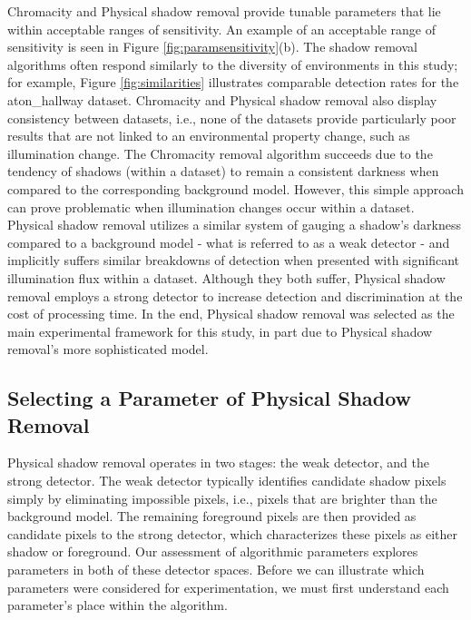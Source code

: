 Chromacity and Physical shadow removal provide tunable parameters that lie within acceptable ranges of sensitivity. An example of an acceptable range of sensitivity is seen in Figure \ref{fig:paramsensitivity}(b). The shadow removal algorithms often respond similarly to the diversity of environments in this study; for example, Figure \ref{fig:similarities} illustrates comparable detection rates for the aton\_hallway dataset. Chromacity and Physical shadow removal also display consistency between datasets, i.e., none of the datasets provide particularly poor results that are not linked to an environmental property change, such as illumination change. The Chromacity removal algorithm succeeds due to the tendency of shadows (within a dataset) to remain a consistent darkness when compared to the corresponding background model. However, this simple approach can prove problematic when illumination changes occur within a dataset. Physical shadow removal utilizes a similar system of gauging a shadow's darkness compared to a background model - what is referred to as a weak detector \cite{cucchiara2003detecting, sanin2010improved, huang2009moving} - and implicitly suffers similar breakdowns of detection when presented with significant illumination flux within a dataset. Although they both suffer, Physical shadow removal employs a strong detector to increase detection and discrimination at the cost of processing time. In the end, Physical shadow removal was selected as the main experimental framework for this study, in part due to Physical shadow removal's more sophisticated model.

\FloatBarrier
\subsection{Selecting a Parameter of Physical Shadow Removal} \label{section:selectparameter}

Physical shadow removal operates in two stages: the weak detector, and the strong detector. The weak detector typically identifies candidate shadow pixels simply by eliminating impossible pixels, i.e., pixels that are brighter than the background model. The remaining foreground pixels are then provided as candidate pixels to the strong detector, which characterizes these pixels as either shadow or foreground. Our assessment of algorithmic parameters explores parameters in both of these detector spaces. Before we can illustrate which parameters were considered for experimentation, we must first understand each parameter's place within the algorithm.

